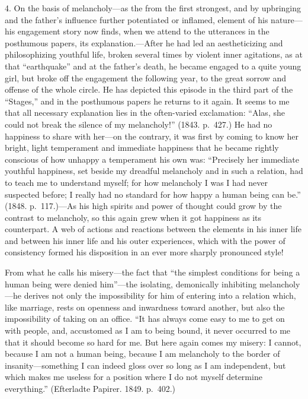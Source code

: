 \documentclass[12pt,a4paper]{book}
\newcommand{\opage}[1]{\marginnote{\footnotesize\textit{[#1]}}}
\begin{document}
4. On the basis of melancholy---as the from the first strongest, and by
upbringing and the father's influence further potentiated or inflamed,
element of his nature---his engagement story now finds, when we attend to
the utterances in the
\opage{38}posthumous papers, its explanation.---After he had led an
aestheticizing and philosophizing youthful life, broken several times by
violent inner agitations, as at that ``earthquake'' and at the father's
death, he became engaged to a quite young girl, but broke off the
engagement the following year, to the great sorrow and offense of the
whole circle. He has depicted this episode in the third part of the
``Stages,'' and in the posthumous papers he returns to it again. It seems
to me that all necessary explanation lies in the often-varied
exclamation: ``Alas, she could not break the silence of my melancholy!''
(1843. p.~427.) He had no happiness to share with her---on the contrary,
it was first by coming to know her bright, light temperament and
immediate happiness that he became rightly conscious of how unhappy a
temperament his own was: ``Precisely her immediate youthful happiness,
set beside my dreadful melancholy and in such a relation, had to teach me
to understand myself; for how melancholy I was I had never suspected
before; I really had no standard for how happy a human being can be.''
(1848. p.~117.)---As his high spirits and power of thought could grow by
the contrast to melancholy, so this again grew when it got happiness as
its counterpart. A web of actions and reactions between the elements in
his inner life and between his inner life and his outer experiences,
which with the power of consistency formed his disposition in an ever
more sharply pronounced style!

From what he calls his misery---the fact that ``the simplest conditions
for being a human being were denied him''---the isolating, demonically
inhibiting melancholy---he derives not only the impossibility for him of
entering into a relation which, like marriage, rests on openness and
inwardness toward another, but also the impossibility of taking on an
office. ``It has
\opage{39}always come easy to me to get on with people, and, accustomed as
I am to being bound, it never occurred to me that it should become so
hard for me. But here again comes my misery: I cannot, because I am not a
human being, because I am melancholy to the border of insanity---something
I can indeed gloss over so long as I am independent, but which makes me
useless for a position where I do not myself determine everything.''
(Efterladte Papirer. 1849. p.~402.)
\end{document}
